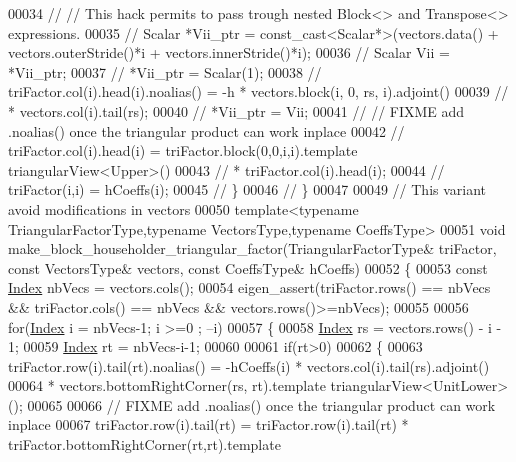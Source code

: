 \begin{DoxyCode}
00034 \textcolor{comment}{//     // This hack permits to pass trough nested Block<> and Transpose<> expressions.}
00035 \textcolor{comment}{//     Scalar *Vii\_ptr = const\_cast<Scalar*>(vectors.data() + vectors.outerStride()*i +
       vectors.innerStride()*i);}
00036 \textcolor{comment}{//     Scalar Vii = *Vii\_ptr;}
00037 \textcolor{comment}{//     *Vii\_ptr = Scalar(1);}
00038 \textcolor{comment}{//     triFactor.col(i).head(i).noalias() = -h * vectors.block(i, 0, rs, i).adjoint()}
00039 \textcolor{comment}{//                                        * vectors.col(i).tail(rs);}
00040 \textcolor{comment}{//     *Vii\_ptr = Vii;}
00041 \textcolor{comment}{//     // FIXME add .noalias() once the triangular product can work inplace}
00042 \textcolor{comment}{//     triFactor.col(i).head(i) = triFactor.block(0,0,i,i).template triangularView<Upper>()}
00043 \textcolor{comment}{//                              * triFactor.col(i).head(i);}
00044 \textcolor{comment}{//     triFactor(i,i) = hCoeffs(i);}
00045 \textcolor{comment}{//   \}}
00046 \textcolor{comment}{// \}}
00047 
00049 \textcolor{comment}{// This variant avoid modifications in vectors}
00050 \textcolor{keyword}{template}<\textcolor{keyword}{typename} TriangularFactorType,\textcolor{keyword}{typename} VectorsType,\textcolor{keyword}{typename} CoeffsType>
00051 \textcolor{keywordtype}{void} make\_block\_householder\_triangular\_factor(TriangularFactorType& triFactor, \textcolor{keyword}{const} VectorsType& vectors, \textcolor{keyword}{
      const} CoeffsType& hCoeffs)
00052 \{
00053   \textcolor{keyword}{const} \hyperlink{namespace_eigen_a62e77e0933482dafde8fe197d9a2cfde}{Index} nbVecs = vectors.cols();
00054   eigen\_assert(triFactor.rows() == nbVecs && triFactor.cols() == nbVecs && vectors.rows()>=nbVecs);
00055 
00056   \textcolor{keywordflow}{for}(\hyperlink{namespace_eigen_a62e77e0933482dafde8fe197d9a2cfde}{Index} i = nbVecs-1; i >=0 ; --i)
00057   \{
00058     \hyperlink{namespace_eigen_a62e77e0933482dafde8fe197d9a2cfde}{Index} rs = vectors.rows() - i - 1;
00059     \hyperlink{namespace_eigen_a62e77e0933482dafde8fe197d9a2cfde}{Index} rt = nbVecs-i-1;
00060 
00061     \textcolor{keywordflow}{if}(rt>0)
00062     \{
00063       triFactor.row(i).tail(rt).noalias() = -hCoeffs(i) * vectors.col(i).tail(rs).adjoint()
00064                                                         * vectors.bottomRightCorner(rs, rt).template 
      triangularView<UnitLower>();
00065             
00066       \textcolor{comment}{// FIXME add .noalias() once the triangular product can work inplace}
00067       triFactor.row(i).tail(rt) = triFactor.row(i).tail(rt) * triFactor.bottomRightCorner(rt,rt).template 

\end{DoxyCode}
